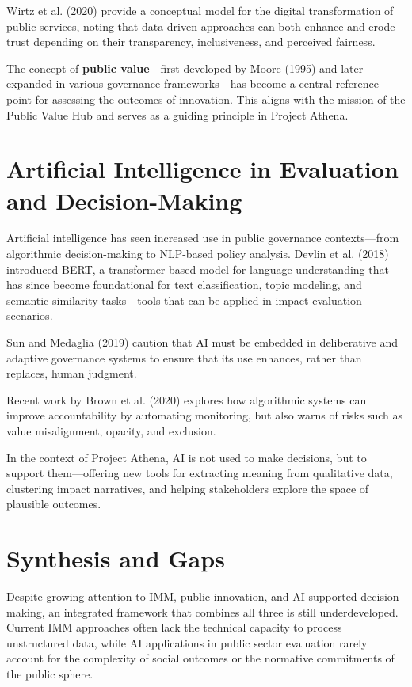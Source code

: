 Wirtz et al. (2020) provide a conceptual model for the digital transformation of public services, noting that data-driven approaches can both enhance and erode trust depending on their transparency, inclusiveness, and perceived fairness.

The concept of \textbf{public value}—first developed by Moore (1995) and later expanded in various governance frameworks—has become a central reference point for assessing the outcomes of innovation. This aligns with the mission of the Public Value Hub and serves as a guiding principle in Project Athena.

\section{Artificial Intelligence in Evaluation and Decision-Making}

Artificial intelligence has seen increased use in public governance contexts—from algorithmic decision-making to NLP-based policy analysis. Devlin et al. (2018) introduced BERT, a transformer-based model for language understanding that has since become foundational for text classification, topic modeling, and semantic similarity tasks—tools that can be applied in impact evaluation scenarios.

Sun and Medaglia (2019) caution that AI must be embedded in deliberative and adaptive governance systems to ensure that its use enhances, rather than replaces, human judgment.

Recent work by Brown et al. (2020) explores how algorithmic systems can improve accountability by automating monitoring, but also warns of risks such as value misalignment, opacity, and exclusion.

In the context of Project Athena, AI is not used to make decisions, but to support them—offering new tools for extracting meaning from qualitative data, clustering impact narratives, and helping stakeholders explore the space of plausible outcomes.

\section{Synthesis and Gaps}

Despite growing attention to IMM, public innovation, and AI-supported decision-making, an integrated framework that combines all three is still underdeveloped. Current IMM approaches often lack the technical capacity to process unstructured data, while AI applications in public sector evaluation rarely account for the complexity of social outcomes or the normative commitments of the public sphere.

